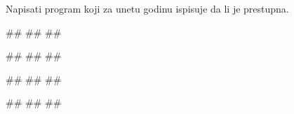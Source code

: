 \begin{Exercise}[label=v1.2_04] 
 Napisati program koji za unetu godinu ispisuje da li je prestupna.
 
\begin{miditest}
\begin{upotreba}{1}
#\naslovInt#
##
##
\end{upotreba}
\end{miditest}
\begin{miditest}
\begin{upotreba}{2}
#\naslovInt#
##
##
\end{upotreba}
\end{miditest}

\begin{miditest}
\begin{upotreba}{3}
#\naslovInt#
##
##
\end{upotreba}
\end{miditest}
\begin{miditest}
\begin{upotreba}{4}
#\naslovInt#
##
##
\end{upotreba}
\end{miditest}
\end{Exercise}
\ifresenja
 \begin{Answer}[ref=v1.2_04]
\end{Answer}
\fi



